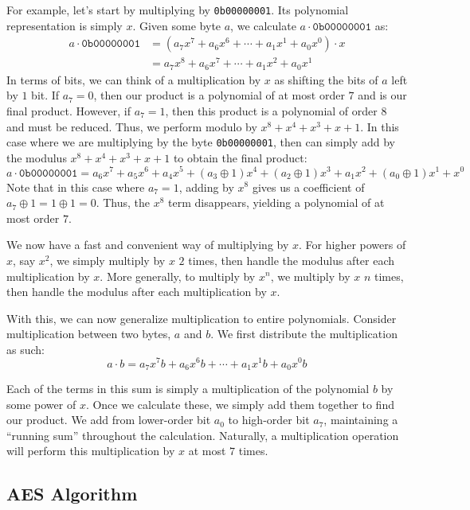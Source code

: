 For example, let's start by multiplying by \texttt{0b00000001}. Its polynomial representation is simply $x$. Given some byte $a$, we calculate $a \cdot \texttt{0b00000001}$ as:
\begin{align*}
    a \cdot \texttt{0b00000001}
    &= (a_7 x^7 + a_6 x^6 + \cdots + a_1 x^1 + a_0 x^0) \cdot x \\
    &= a_7 x^8 + a_6 x^7 + \cdots + a_1 x^2 + a_0 x^1
\end{align*}
In terms of bits, we can think of a multiplication by $x$ as shifting the bits of $a$ left by $1$ bit. If $a_7 = 0$, then our product is a polynomial of at most order $7$ and is our final product. However, if $a_7 = 1$, then this product is a polynomial of order $8$ and must be reduced. Thus, we perform modulo by $x^8 + x^4 + x^3 + x + 1$. In this case where we are multiplying by the byte \texttt{0b00000001}, then can simply add by the modulus $x^8 + x^4 + x^3 + x + 1$ to obtain the final product:
\[ a \cdot \texttt{0b00000001} = a_6 x^7 + a_5 x^6 + a_4 x^5 + (a_3 \oplus 1) x^4 + (a_2 \oplus 1) x^3 + a_1 x^2 + (a_0 \oplus 1) x^1 + x^0 \]
Note that in this case where $a_7 = 1$, adding by $x^8$ gives us a coefficient of $a_7 \oplus 1 = 1 \oplus 1 = 0$. Thus, the $x^8$ term disappears, yielding a polynomial of at most order $7$.

We now have a fast and convenient way of multiplying by $x$. For higher powers of $x$, say $x^2$, we simply multiply by $x$ $2$ times, then handle the modulus after each multiplication by $x$. More generally, to multiply by $x^n$, we multiply by $x$ $n$ times, then handle the modulus after each multiplication by $x$.

With this, we can now generalize multiplication to entire polynomials. Consider multiplication between two bytes, $a$ and $b$. We first distribute the multiplication as such:
\[ a \cdot b = a_7 x^7 b + a_6 x^6 b + \cdots + a_1 x^1 b + a_0 x^0 b \]

Each of the terms in this sum is simply a multiplication of the polynomial $b$ by some power of $x$. Once we calculate these, we simply add them together to find our product. We add from lower-order bit $a_0$ to high-order bit $a_7$, maintaining a ``running sum'' throughout the calculation. Naturally, a multiplication operation will perform this multiplication by $x$ at most $7$ times.

\subsection{AES Algorithm}

